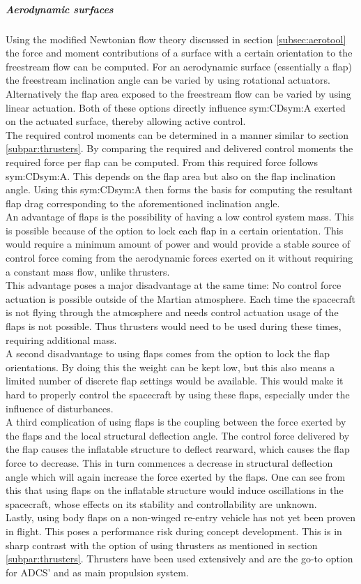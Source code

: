 \subparagraph{Aerodynamic surfaces}
Using the modified Newtonian flow theory discussed in section \ref{subsec:aerotool} the force and moment contributions of a surface with a certain orientation to the freestream flow can be computed. For an aerodynamic surface (essentially a flap) the freestream inclination angle can be varied by using rotational actuators. Alternatively the flap area exposed to the freestream flow can be varied by using linear actuation. Both of these options directly influence \gls{sym:CD}\gls{sym:A} exerted on the actuated surface, thereby allowing active control.\\
The required control moments can be determined in a manner similar to section \ref{subpar:thrusters}. By comparing the required and delivered control moments the required force per flap can be computed. From this required force follows \gls{sym:CD}\gls{sym:A}. This depends on the flap area but also on the flap inclination angle. Using this \gls{sym:CD}\gls{sym:A} then forms the basis for computing the resultant flap drag corresponding to the aforementioned inclination angle.\\
An advantage of flaps is the possibility of having a low control system mass. This is possible because of the option to lock each flap in a certain orientation. This would require a minimum amount of power and would provide a stable source of control force coming from the aerodynamic forces exerted on it without requiring a constant mass flow, unlike thrusters.\\
This advantage poses a major disadvantage at the same time: No control force actuation is possible outside of the Martian atmosphere. Each time the spacecraft is not flying through the atmosphere and needs control actuation usage of the flaps is not possible. Thus thrusters would need to be used during these times, requiring additional mass.\\
A second disadvantage to using flaps comes from the option to lock the flap orientations. By doing this the weight can be kept low, but this also means a limited number of discrete flap settings would be available. This would make it hard to properly control the spacecraft by using these flaps, especially under the influence of disturbances.\\
A third complication of using flaps is the coupling between the force exerted by the flaps and the local structural deflection angle. The control force delivered by the flap causes the inflatable structure to deflect rearward, which causes the flap force to decrease. This in turn commences a decrease in structural deflection angle which will again increase the force exerted by the flaps. One can see from this that using flaps on the inflatable structure would induce oscillations in the spacecraft, whose effects on its stability and controllability are unknown.\\
Lastly, using body flaps on a non-winged re-entry vehicle has not yet been proven in flight. This poses a performance risk during concept development. This is in sharp contrast with the option of using thrusters as mentioned in section \ref{subpar:thrusters}. Thrusters have been used extensively and are the go-to option for ADCS' and as main propulsion system.
